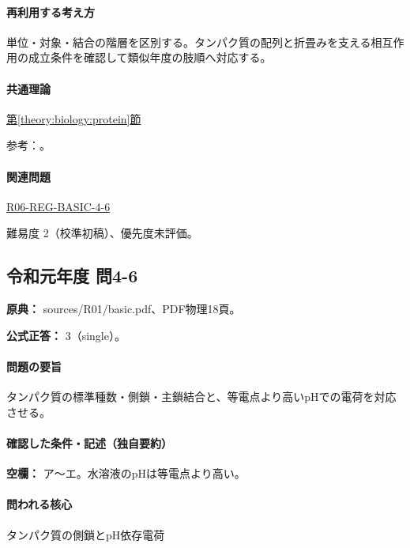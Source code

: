 \paragraph{再利用する考え方} 単位・対象・結合の階層を区別する。タンパク質の配列と折畳みを支える相互作用の成立条件を確認して類似年度の肢順へ対応する。

\paragraph{共通理論} \hyperref[theory:biology:protein]{第\ref*{theory:biology:protein}節}

\par 参考：\cite{mit_protein}。

\paragraph{関連問題} \hyperref[q:r06-reg-basic-4-6]{R06-REG-BASIC-4-6}

\par 難易度 2（校準初稿）、優先度未評価。

\subsection{令和元年度 問4-6}
\label{q:r01-reg-basic-4-6}

\noindent\textbf{原典：} sources/R01/basic.pdf、PDF物理18頁。

\textbf{公式正答：} 3（single）。

\paragraph{問題の要旨} タンパク質の標準種数・側鎖・主鎖結合と、等電点より高いpHでの電荷を対応させる。

\paragraph{確認した条件・記述（独自要約）}\mbox{}\par

\noindent\textbf{空欄：} ア〜エ。水溶液のpHは等電点より高い。\par

\paragraph{問われる核心} タンパク質の側鎖とpH依存電荷

